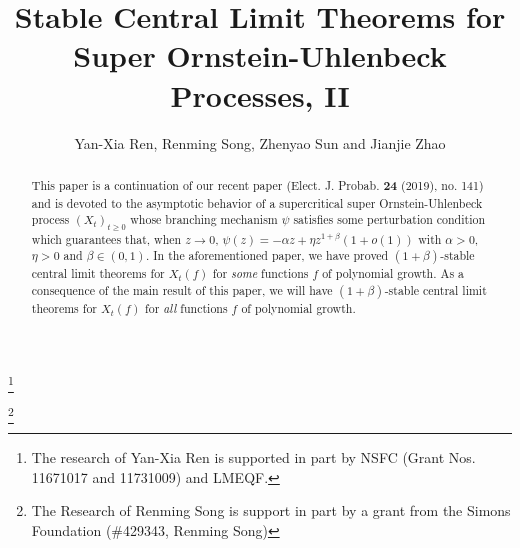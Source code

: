\documentclass[12pt,a4paper]{amsart}
\theoremstyle{plain}
\theoremstyle{definition}
\numberwithin{equation}{section}
\begin{document}
\title
[stable CLT for super-OU processes]
{Stable Central Limit Theorems for Super Ornstein-Uhlenbeck Processes, II}
\author
[Y.-X. Ren, R. Song, Z. Sun and J. Zhao]
{Yan-Xia Ren, Renming Song, Zhenyao Sun and Jianjie Zhao}
\address{
  Yan-Xia Ren \\
  LMAM School of Mathematical Sciences \& Center for Statistical Science \\
  Peking University \\
  Beijing, P. R. China, 100871}
\thanks{The research of Yan-Xia Ren is supported in part by NSFC (Grant Nos. 11671017  and 11731009) and LMEQF.}
\address{
  Renming Song \\
  Department of Mathematics \\
  University of Illinois at Urbana-Champaign \\
  Urbana, IL, USA, 61801}
\thanks{The Research of Renming Song is support in part by a grant from the Simons Foundation (\#429343, Renming Song)}
\address{
  Zhenyao Sun \\
  School of Mathematics and Statistics\\
  Wuhan University \\
  Hubei, P. R. China, 100871}
\address{
  Jianjie Zhao \\
  School of Mathematical Sciences \\
  Peking University \\
  Beijing, P. R. China, 100871}

\begin{abstract}
This paper is a continuation of our recent paper (Elect. J. Probab. \textbf{24} (2019), no. 141)
and is devoted to the  asymptotic behavior of a supercritical super Ornstein-Uhlenbeck process $(X_t)_{t\geq 0}$
 whose branching mechanism $\psi$ satisfies some perturbation condition which guarantees that,
 when $z\to 0$, $\psi(z)=-\alpha z + \eta z^{1+\beta} (1+o(1))$ with $\alpha > 0$, $\eta>0$ and $\beta\in (0, 1)$.
In the aforementioned paper, we have proved $(1+\beta)$-stable central limit theorems
for  $X_t(f) $ for {\it some} functions $f$ of polynomial growth.
As a consequence of the main result of this paper, we will have
$(1+\beta)$-stable central limit theorems for  $X_t(f) $ for {\it all} functions $f$ of polynomial growth.
\end{abstract}
\maketitle
\end{document}
